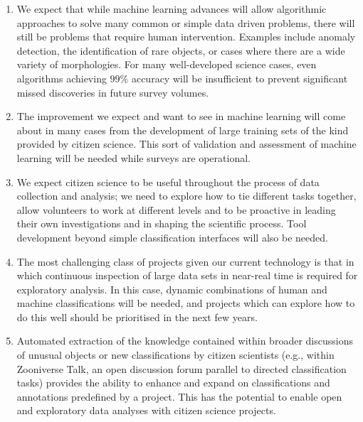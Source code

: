 \documentclass{pasa}
\begin{document}
\begin{enumerate} 

\item We expect that while machine learning advances will allow algorithmic approaches to solve many common or simple data driven problems, there will still be problems that require human intervention. Examples include anomaly detection, the identification of rare objects, or cases where there are a wide variety of morphologies. For many well-developed science cases, even algorithms achieving $99\%$ accuracy will be insufficient to prevent significant missed discoveries in future survey volumes.

\item The improvement we expect and want to see in machine learning will come about in many cases from the development of large training sets of the kind provided by citizen science.  This sort of validation and assessment of machine learning will be needed while surveys are operational. 

\item We expect citizen science to be useful throughout the process of data collection and analysis; we need to explore how to tie different tasks together, allow volunteers to work at different levels and to be proactive in leading their own investigations and in shaping the scientific process. Tool development beyond simple classification interfaces will also be needed. 

\item The most challenging class of projects given our current technology is that in which continuous inspection of large data sets in near-real time is required for exploratory analysis. In this case, dynamic combinations of human and machine classifications will be needed, and projects which can explore how to do this well should be prioritised in the next few years. 

\item Automated extraction of the knowledge contained within broader discussions of unusual objects or new classifications by citizen scientists (e.g., within Zooniverse Talk, an open discussion forum parallel to directed classification tasks) provides the ability to enhance and expand on classifications and annotations predefined by a project. This has the potential to enable open and exploratory data analyses with citizen science projects.


\end{enumerate}
\end{document}
